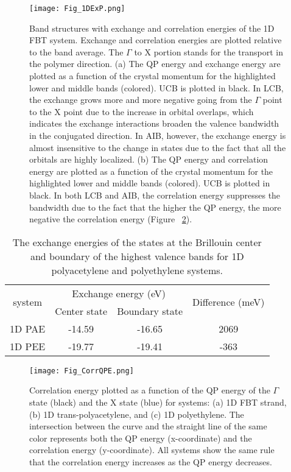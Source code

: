 \documentclass[journal = jpclcd]{achemso}
\begin{document}
\begin{figure}[H]
    \centering
    \texttt{[image: Fig\_1DExP.png]}
    \caption{Band structures with exchange and correlation energies of the 1D FBT system. Exchange and correlation energies are plotted relative to the band average. The $\Gamma$ to X portion stands for the transport in the polymer direction. (a) The QP energy and exchange energy are plotted  as a function of the crystal momentum for the highlighted lower and middle bands (colored). UCB is plotted in black. In LCB, the exchange grows more and more negative going from the $\Gamma$ point to the X point due to the increase in orbital overlaps, which indicates the exchange interactions broaden the valence bandwidth in the conjugated direction. In AIB, however, the exchange energy is almost insensitive to the change in states due to the fact that all the orbitals are highly localized. (b) The QP energy and correlation energy are plotted  as a function of the crystal momentum for the highlighted lower and middle bands (colored).  UCB is plotted in black. In both LCB and AIB, the correlation energy suppresses the bandwidth due to the fact that the higher the QP energy, the more negative the correlation energy (Figure ~\ref{Fig_CorrQPE}).} 
    \label{Fig_1DExP}
\end{figure}

 \begin{table}[H]
     \centering
     \begin{tabular}{c|c|c|c}
 \multirow{2}{*}{system} & \multicolumn{2}{c|}{Exchange energy (eV)} & \multirow{2}{*}{Difference (meV)} \\ \cline{2-3} 
            & Center state         & Boundary state                                                       \\ \hline
 1D PAE     & -14.59           & -16.65           & 2069 \\
 1D PEE     & -19.77           & -19.41           & -363                                 
     \end{tabular}
     \caption{The exchange energies of the states at the Brillouin center and boundary of the highest valence bands for 1D polyacetylene and polyethylene systems.}
     \label{tab:exchange-driven_band_broadening}
\end{table}

\begin{figure}[H]
    \centering
    \texttt{[image: Fig\_CorrQPE.png]}
    \caption{Correlation energy plotted as a function of the QP energy of the $\Gamma$ state (black) and the X state (blue) for systems: (a) 1D FBT strand, (b) 1D trans-polyacetylene, and (c) 1D polyethylene. The intersection between the curve and the straight line of the same color represents both the QP energy (x-coordinate) and the correlation energy (y-coordinate). All systems show the same rule that the correlation energy increases as the QP energy decreases.}
    \label{Fig_CorrQPE}
\end{figure}
\end{document}

